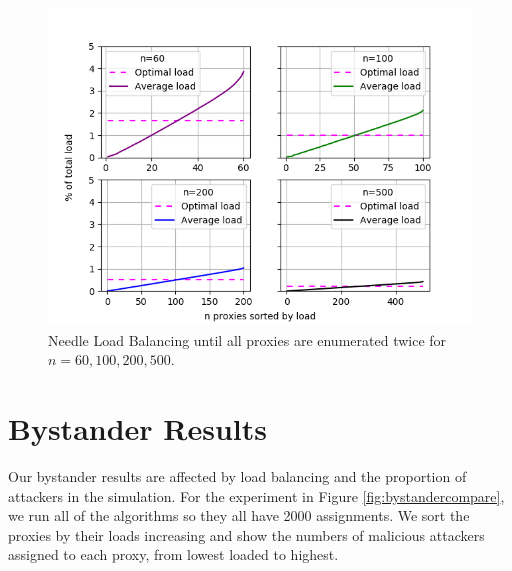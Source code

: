 \begin{figure}[h!]
\centering
     \includegraphics[width=1.0\textwidth]{fig/load_balance_needle_to_twice_enum_60_100_200_500.png}
    \caption{Needle Load Balancing until all proxies are enumerated twice for $n=60, 100, 200, 500$.}

    \label{fig:needlelb3}
\end{figure}


\section{Bystander Results}

Our bystander results are affected by load balancing and the proportion of attackers in the simulation. For the experiment in Figure \ref{fig:bystandercompare}, we run all of the algorithms so they all have 2000 assignments. We sort the proxies by their loads increasing and show the numbers of malicious attackers assigned to each proxy, from lowest loaded to highest.

